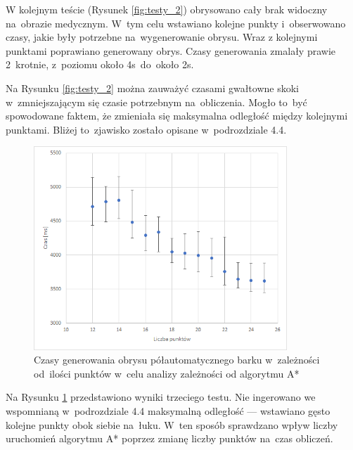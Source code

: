 \documentclass[a4paper,11pt,twoside,openright]{report}
\theoremstyle{definition}
\begin{document}
W kolejnym teście (Rysunek \ref{fig:testy_2}) obrysowano
cały brak widoczny na~obrazie medycznym. W~tym celu wstawiano kolejne
punkty i~obserwowano czasy, jakie były potrzebne na~wygenerowanie obrysu. Wraz z
kolejnymi punktami poprawiano generowany obrys. Czasy generowania zmalały prawie 2~krotnie, z~poziomu
około 4s~do~około 2s.



Na Rysunku \ref{fig:testy_2} można zauważyć czasami gwałtowne skoki w~zmniejszającym
się czasie potrzebnym na~obliczenia. Mogło to~być spowodowane faktem, że zmieniała
się maksymalna odległość między kolejnymi punktami. Bliżej to~zjawisko zostało
opisane w~podrozdziale 4.4.

\begin{figure}[h!]
	\center
	\includegraphics[width=0.85\textwidth]{150}
	\caption{Czasy generowania obrysu półautomatycznego barku w~zależności od~ilości punktów
	w~celu analizy zależności od algorytmu A*}
    	\label{fig:testy_3}
\end{figure}

Na Rysunku \ref{fig:testy_3} przedstawiono wyniki trzeciego testu. Nie ingerowano
we wspomnianą w~podrozdziale 4.4 maksymalną odległość --- wstawiano gęsto kolejne
punkty obok siebie na~łuku. W~ten sposób sprawdzano wpływ liczby uruchomień
algorytmu A* poprzez zmianę liczby punktów na~czas obliczeń.
\end{document}
